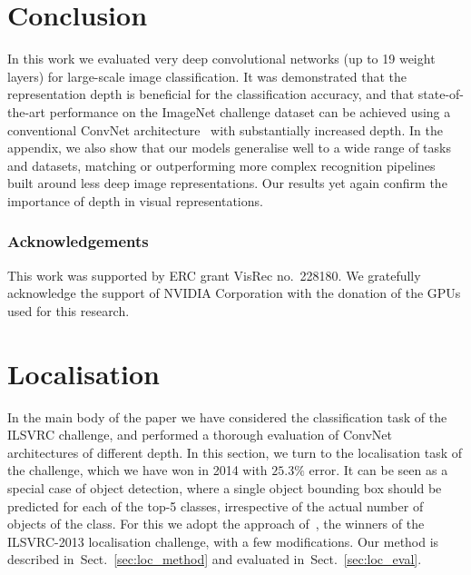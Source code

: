 \documentclass{article} %
\newcommand{\sref}[1]{Sect.~\ref{#1}}
\begin{document}
\vspace{-1em}

\section{Conclusion}
\label{sec:conclusion}
In this work we evaluated very deep convolutional networks (up to 19 weight layers) for large-scale image classification.
It was demonstrated that the representation depth is beneficial for the classification accuracy, and that 
state-of-the-art performance on the ImageNet challenge dataset can be achieved using a conventional ConvNet architecture~\citep{LeCun89,Krizhevsky12}
with substantially increased depth. 
In the appendix, we also show that our models generalise well to a wide range of tasks and datasets, matching or outperforming more complex recognition pipelines built around less deep image representations.
Our results yet again confirm the importance of depth in visual representations.

\subsubsection*{Acknowledgements}
This work was supported by ERC grant VisRec no.\ 228180. 
We gratefully acknowledge the support of NVIDIA Corporation with the donation of the GPUs used for this research.


{
    \small
    \setlength{\bibsep}{3pt}
    
}

\appendix

\section{Localisation}
\label{sec:loc}
In the main body of the paper we have considered the classification task of the ILSVRC challenge, and performed a thorough evaluation of ConvNet architectures of different depth.
In this section, we turn to the localisation task of the challenge, which we have won in 2014 with $25.3\%$ error.
It can be seen as a special case of object detection, where a single object bounding box should be predicted for each of the top-5 classes, irrespective of the actual number of objects of the class.
For this we adopt the approach of~\citet{Sermanet14}, the winners of the ILSVRC-2013 localisation challenge, with a few modifications.
Our method is described in~\sref{sec:loc_method} and evaluated in~\sref{sec:loc_eval}.
\end{document}

